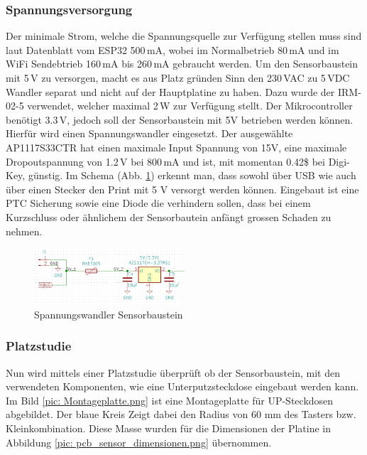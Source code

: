 \subsubsection{Spannungsversorgung}
Der minimale Strom, welche die Spannungsquelle zur Verfügung stellen muss sind laut Datenblatt vom ESP32 500\,mA, wobei im Normalbetrieb 80\,mA und im WiFi Sendebtrieb 160\,mA bis 260\,mA gebraucht werden.
Um den Sensorbaustein mit 5\,V zu versorgen, macht es aus Platz gründen Sinn den 230\,VAC zu 5\,VDC Wandler separat und nicht auf der Hauptplatine zu haben. Dazu wurde der IRM-02-5 verwendet, welcher maximal 2\,W zur Verfügung stellt. Der Mikrocontroller benötigt 3.3\,V, jedoch soll der Sensorbaustein mit 5V betrieben werden können. Hierfür wird einen Spannungswandler eingesetzt. Der ausgewählte AP1117S33CTR hat einen maximale Input Spannung von 15V, eine maximale Dropoutspannung von 1.2\,V bei 800\,mA und ist, mit momentan 0.42\$ bei Digi-Key, günstig. Im Schema (Abb. \ref{pic: Wandler_Sensor}) erkennt man, dass sowohl über USB wie auch über einen Stecker den Print mit 5 V versorgt werden können. Eingebaut ist eine PTC Sicherung sowie eine Diode die verhindern sollen, dass bei einem Kurzschluss oder ähnlichem der Sensorbautein anfängt grossen Schaden zu nehmen.

\begin{figure}[h!]
	\centering
	\includegraphics[width=0.5\textwidth]{graphics/shematics_sensor_33V.png}
	\caption{Spannungswandler Sensorbaustein}
	\label{pic: Wandler_Sensor}
\end{figure}

\subsubsection{Platzstudie}
Nun wird mittels einer Platzstudie überprüft ob der Sensorbaustein, mit den verwendeten Komponenten, wie eine Unterputzsteckdose eingebaut werden kann.
Im Bild \ref{pic: Montageplatte.png} ist eine Montageplatte für UP-Steckdosen abgebildet. Der blaue Kreis Zeigt dabei den Radius von 60 mm des Tasters bzw. Kleinkombination. Diese Masse wurden für die Dimensionen der Platine in Abbildung \ref{pic: pcb_sensor_dimensionen.png} übernommen.

